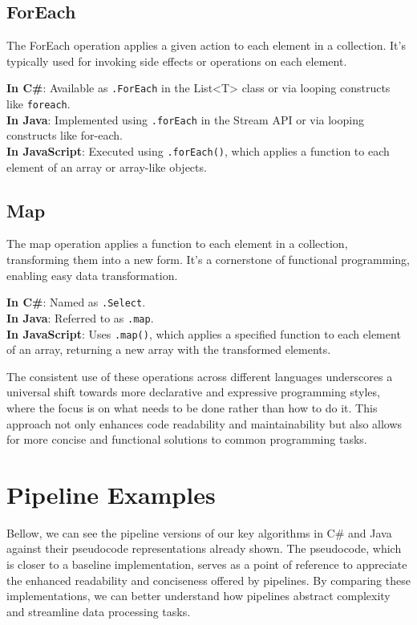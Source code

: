\subsection*{ForEach}
The ForEach operation applies a given action to each element in a collection. It's typically used for invoking side effects or operations on each element.

\textbf{In C\#}: Available as \texttt{.ForEach} in the List<T> class or via looping constructs like \texttt{foreach}. \\
\textbf{In Java}: Implemented using \texttt{.forEach} in the Stream API or via looping constructs like for-each. \\
\textbf{In JavaScript}: Executed using \texttt{.forEach()}, which applies a function to each element of an array or array-like objects.

\subsection*{Map}
The map operation applies a function to each element in a collection, transforming them into a new form. It's a cornerstone of functional programming, enabling easy data transformation.

\textbf{In C\#}: Named as \texttt{.Select}. \\
\textbf{In Java}: Referred to as \texttt{.map}. \\
\textbf{In JavaScript}: Uses \texttt{.map()}, which applies a specified function to each element of an array, returning a new array with the transformed elements.

The consistent use of these operations across different languages underscores a universal shift towards more declarative and expressive programming styles, where the focus is on what needs to be done rather than how to do it. This approach not only enhances code readability and maintainability but also allows for more concise and functional solutions to common programming tasks.

\section{Pipeline Examples}
Bellow, we can see the pipeline versions of our key algorithms in C\# and Java against their pseudocode representations already shown. The pseudocode, which is closer to a baseline implementation, serves as a point of reference to appreciate the enhanced readability and conciseness offered by pipelines. By comparing these implementations, we can better understand how pipelines abstract complexity and streamline data processing tasks.

